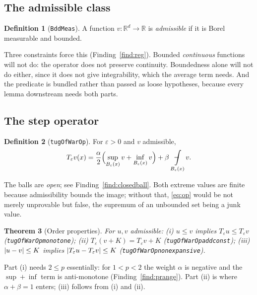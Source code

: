 \documentclass[11pt,reqno]{amsart}
\newcommand{\fint}{\mathop{\mathrlap{\,\rule[0.62ex]{0.62em}{0.5pt}}\int}}
\newcommand{\LEANREF}[1]{\texttt{\small\def\_{\textunderscore\allowbreak}#1}}
\newcommand{\R}{\mathbb{R}}
\newcommand{\eps}{\varepsilon}
\newcommand{\Op}{T_\eps}
\newcommand{\avgint}{\fint}
\DeclarePairedDelimiter{\abs}{\lvert}{\rvert}
\theoremstyle{plain}
\newtheorem{theorem}{Theorem}[section]
\theoremstyle{definition}
\newtheorem{definition}[theorem]{Definition}
\begin{document}
\subsection{The admissible class}

\begin{definition}[\LEANREF{BddMeas}]\label{def:bddmeas}
A function $v \colon \R^d \to \R$ is \emph{admissible} if it is Borel
measurable and bounded.
\end{definition}

Three constraints force this (Finding~\ref{find:reg}). Bounded \emph{continuous}
functions will not do: the operator does not preserve continuity. Boundedness
alone will not do either, since it does not give integrability, which the
average term needs. And the predicate is bundled rather than passed as loose
hypotheses, because every lemma downstream needs both parts.

\subsection{The step operator}

\begin{definition}[\LEANREF{tugOfWarOp}]\label{def:op}
For $\eps > 0$ and $v$ admissible,
\begin{equation}\label{eq:op}
  \Op v(x) = \frac{\alpha}{2}\Bigl(\sup_{B_\eps(x)} v + \inf_{B_\eps(x)} v\Bigr)
    + \beta \avgint_{B_\eps(x)} v .
\end{equation}
\end{definition}

The balls are \emph{open}; see Finding~\ref{find:closedball}. Both extreme
values are finite because admissibility bounds the image; without that,
\eqref{eq:op} would be not merely unprovable but false, the supremum of an
unbounded set being a junk value.

\begin{theorem}[Order properties]\label{thm:one}
For $u,v$ admissible:
\emph{(i)} $u \le v$ implies $\Op u \le \Op v$
(\LEANREF{tugOfWarOp\_monotone});
\emph{(ii)} $\Op(v+K) = \Op v + K$ (\LEANREF{tugOfWarOp\_add\_const});
\emph{(iii)} $\abs{u-v} \le K$ implies $\abs{\Op u - \Op v} \le K$
(\LEANREF{tugOfWarOp\_nonexpansive}).
\end{theorem}

Part (i) needs $2 \le p$ essentially: for $1<p<2$ the weight $\alpha$ is
negative and the $\sup+\inf$ term is anti-monotone
(Finding~\ref{find:prange}). Part (ii) is where $\alpha+\beta=1$ enters;
(iii) follows from (i) and (ii).
\end{document}
